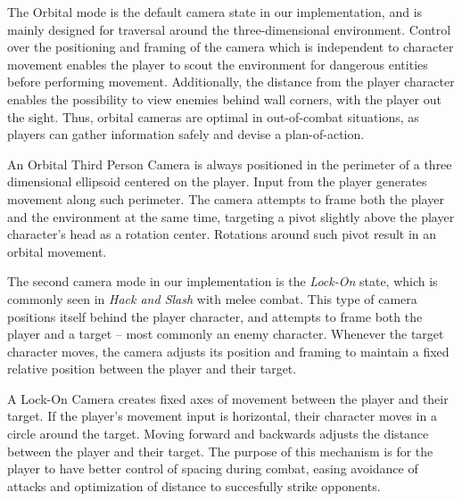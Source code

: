 The Orbital mode is the default camera state in our implementation, and is mainly designed for traversal around the three-dimensional environment. Control over the positioning and framing of the camera which is independent to character movement enables the player to scout the environment for dangerous entities before performing movement. Additionally, the distance from the player character enables the possibility to view enemies behind wall corners, with the player out the sight. Thus, orbital cameras are optimal in out-of-combat situations, as players can gather information safely and devise a plan-of-action.

An Orbital Third Person Camera is always positioned in the perimeter of a three dimensional ellipsoid centered on the player. Input from the player generates movement along such perimeter. The camera attempts to frame both the player and the environment at the same time, targeting a pivot slightly above the player character's head as a rotation center. Rotations around such pivot result in an orbital movement.

The second camera mode in our implementation is the \emph{Lock-On} state, which is commonly seen in \emph{Hack and Slash} with melee combat. This type of camera positions itself behind the player character, and attempts to frame both the player and a target -- most commonly an enemy character. Whenever the target character moves, the camera adjusts its position and framing to maintain a fixed relative position between the player and their target.

A Lock-On Camera creates fixed axes of movement between the player and their target. If the player's movement input is horizontal, their character moves in a circle around the target. Moving forward and backwards adjusts the distance between the player and their target. The purpose of this mechanism is for the player to have better control of spacing during combat, easing avoidance of attacks and optimization of distance to succesfully strike opponents.

